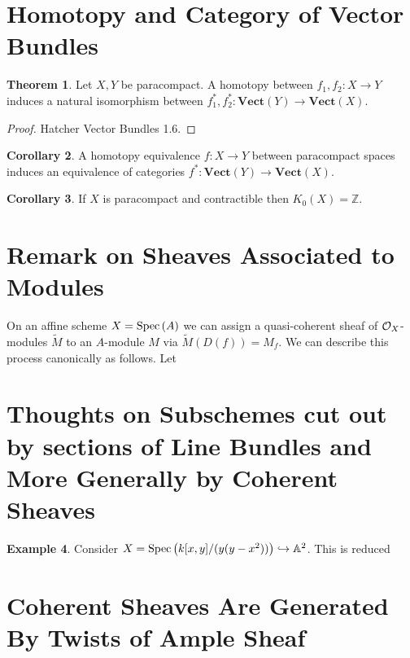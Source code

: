 \documentclass[12pt]{extarticle}
\newcommand{\Z}{\mathbb{Z}}
\theoremstyle{definition}
\newtheorem{theorem}{Theorem}[section]
\newtheorem{example}[theorem]{Example}
\newtheorem{corollary}[theorem]{Corollary}
\newcommand{\embed}{\hookrightarrow}
\begin{document}
\section{Homotopy and Category of Vector Bundles}

\newcommand{\Vect}[1]{\mathbf{Vect}\left(#1 \right)}

\begin{theorem}
Let $X, Y$ be paracompact. A homotopy between $f_1, f_2 : X \to Y$ induces a natural isomorphism between $f_1^*, f_2^* : \Vect{Y} \to \Vect{X}$. 
\end{theorem}

\begin{proof}
Hatcher Vector Bundles 1.6.
\end{proof}

\begin{corollary}
A homotopy equivalence $f : X \to Y$ between paracompact spaces induces an equivalence of categories $f^* : \Vect{Y} \to \Vect{X}$. 
\end{corollary}

\begin{corollary}
If $X$ is paracompact and contractible then $K_0(X) = \Z$. 
\end{corollary}

\section{Remark on Sheaves Associated to Modules}

On an affine scheme $X = \mathrm{Spec}\left(A\right)$ we can assign a quasi-coherent sheaf of $\mathcal{O}_{X}$-modules $\widetilde{M}$ to an $A$-module $M$ via $\widetilde{M}(D(f)) = M_f$. We can describe this process canonically as follows. Let 


\section{Thoughts on Subschemes cut out by sections of Line Bundles and More Generally by Coherent Sheaves}

\begin{example}
Consider $X = \Spec{k[x, y] / (y(y - x^2))} \embed \A^2$. This is reduced 
\end{example}


\section{Coherent Sheaves Are Generated By Twists of Ample Sheaf}
\end{document}
